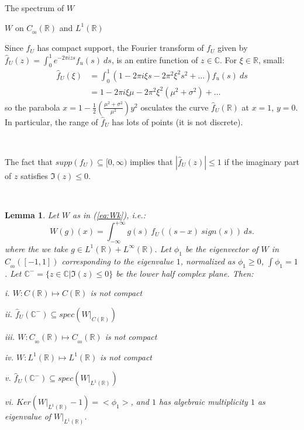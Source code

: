\documentclass[12pt]{article}
\newtheorem*{lmm}{Lemma}
\begin{document}
\begin{section}{The spectrum of $W$ }
\begin{subsection}{$W$ on $C_{_{0\!0}}(\mathbb{R})$ and $L^1(\mathbb{R})$}
\  
\  

Since $f_U$ has compact support, the Fourier transform of $f_U$ given by $\hat{f}_U(z) = \int_0^1 e^{-2 \pi i z s} f_u(s) \ ds$, is an entire function of $z \in \mathbb{C}$. For $\xi \in \mathbb{R}$, small:
\begin{align*}
\hat{f}_U(\xi) &= \int_0^1 (1 - 2 \pi i \xi s - 2 \pi^2 \xi^2 s^2 + \dots) f_u(s) \ ds \\
&= 1 - 2 \pi i \xi \mu - 2 \pi^2 \xi^2 (\mu^2 + \sigma^2) + \dots
\end{align*}
so the parabola $x = 1 - \frac{1}{2} \left( \frac{\mu^2 + \sigma^2}{\mu^2} \right) y^2$ osculates the curve $\hat{f}_U(\mathbb{R})$ at $x=1$, $y=0$. In particular, the range of $\hat{f}_U$ has lots of points (it is not discrete). 

\  
\  

The fact that $supp(f_U) \subseteq [0,\infty)$ implies that $|\hat{f}_U(z)| \le 1$ if the imaginary part of $z$ satisfies $\Im(z) \le 0$.  

\  
\  

\begin{lmm}  Let $W$ as in (\ref{eq:Wk}), i.e.:
	\begin{equation*}
	W(g)(x) = \int_{-\infty}^{+\infty} g(s)\ f_U\!\left(  \left(s - x \right)\ sign(s) \right) \ ds.
	\end{equation*}
 where the we take $g \in  L^1(\mathbb{R}) + L^{\infty}(\mathbb{R})$. Let $\phi_1$ be the eigenvector of $W$ in $C_{_{0\!0}}([-1,1])$ corresponding to the eigenvalue $1$, normalized as $\phi_1 \ge 0$, $\int \phi_1 = 1$. Let $\mathbb{C}^- = \{z \in \mathbb{C}| \Im(z) \le 0 \}$ be the lower half complex plane. Then:
	\item[i.]  $W: C(\mathbb{R}) \longmapsto C(\mathbb{R})$ is not compact
	
	\item[ii.] $\hat{f}_U(\mathbb{C}^-) \subseteq spec\left(W\Big|_{C(\mathbb{R})}  \right)$
	
	\item[iii.]  $W: C_{_{0\!0}}(\mathbb{R}) \longmapsto C_{_{0\!0}}(\mathbb{R}) $ is not compact
	
	\item[iv.]  $W: L^1(\mathbb{R}) \longmapsto L^1(\mathbb{R}) $ is not compact
	
	\item[v.] $\hat{f}_U(\mathbb{C}^-) \subseteq spec(W\Big|_{L^1(\mathbb{R})}) $

	\item[vi.] $ Ker\left( W\Big|_{L^1(\mathbb{R})} - 1 \right) = <\phi_1>$, and $1$ has algebraic multiplicity $1$ as eigenvalue of $W\Big|_{L^1(\mathbb{R})}$.
\end{lmm}
\  


\end{subsection}
\end{section}
\end{document}
